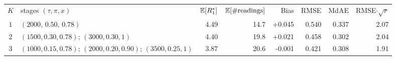\begin{tabular}{cp{4.6cm}rrrrrr}
\toprule
$K$ & stages $(\tau,\pi,x)$ & $\mathbb{E}[R_1^{*}]$ & $\mathbb{E}[\#\text{readings}]$ & Bias & RMSE & MdAE & RMSE$\cdot\sqrt{r}$ \\
$1$ & $(2000,\,0.50,\,0.78)$ & 4.49 & 14.7 & +0.045 & 0.540 & 0.337 & 2.07 \\
$2$ & $(1500,0.30,0.78)$; $(3000,0.30,1)$ & 4.40 & 19.8 & +0.021 & 0.458 & 0.302 & 2.04 \\
$3$ & $(1000,0.15,0.78)$; $(2000,0.20,0.90)$; $(3500,0.25,1)$ & 3.87 & 20.6 & -0.001 & 0.421 & 0.308 & 1.91 \\
\bottomrule
\end{tabular}
